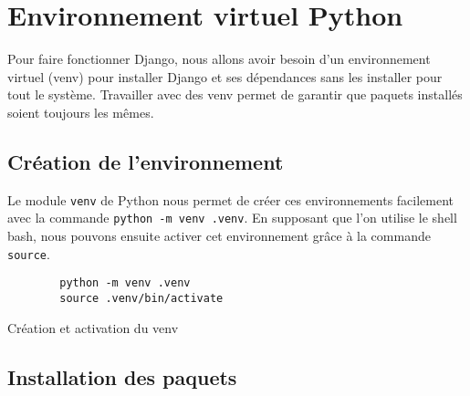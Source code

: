 \documentclass{article}
\begin{document}
    \section{Environnement virtuel Python}
        Pour faire fonctionner Django, nous allons avoir besoin d'un environnement virtuel (venv) pour installer Django et ses dépendances sans les installer pour tout le système. Travailler avec des venv permet de garantir que paquets installés soient toujours les mêmes. 
            \subsection{Création de l'environnement}
            Le module \verb|venv| de Python nous permet de créer ces environnements facilement avec la commande \verb|python -m venv .venv|. En supposant que l'on utilise le shell bash, nous pouvons ensuite activer cet environnement grâce à la commande \verb|source|.
            \begin{listing}[H]
                \begin{verbatim}
        python -m venv .venv
        source .venv/bin/activate
                \end{verbatim}
                \caption{Création et activation du venv}
                \label{lst:creation-venv}
            \end{listing}

            \subsection{Installation des paquets}
\end{document}
